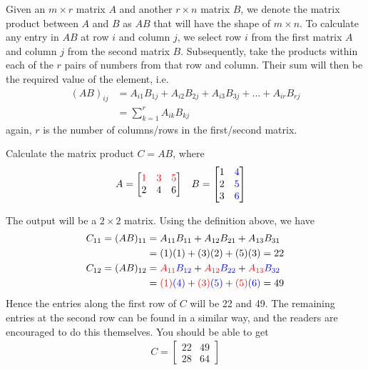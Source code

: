 \begin{defn}
\label{defn:matprod}
Given an $m \times r$ matrix $A$ and another $r \times n$ matrix $B$, we denote the matrix product between $A$ and $B$ as $AB$ that will have the shape of $m \times n$. To calculate any entry in $AB$ at row $i$ and column $j$, we select row $i$ from the first matrix $A$ and column $j$ from the second matrix $B$. Subsequently, take the products within each of the $r$ pairs of numbers from that row and column. Their sum will then be the required value of the element, i.e.\
\begin{align*}
(AB)_{ij} &= A_{i1}B_{1j} + A_{i2}B_{2j} + A_{i3}B_{3j} + ... + A_{ir}B_{rj} \\
&= \sum_{k=1}^{r} A_{ik}B_{kj}
\end{align*}
again, $r$ is the number of columns/rows in the first/second matrix.
\end{defn}
\begin{exmp}
Calculate the matrix product $C = AB$, where
\begin{align*}
& A = 
\begin{bmatrix}
\textcolor{red}{1} & \textcolor{red}{3} & \textcolor{red}{5} \\
2 & 4 & 6 
\end{bmatrix} &
& B = 
\begin{bmatrix}
1 & \textcolor{blue}{4} \\
2 & \textcolor{blue}{5} \\
3 & \textcolor{blue}{6}
\end{bmatrix}
\end{align*}
\end{exmp}
\begin{solution}
The output will be a $2 \times 2$ matrix. Using the definition above, we have
\begin{align*}
C_{11} = (AB)_{11} &= A_{11}B_{11} + A_{12}B_{21} + A_{13}B_{31} \\
&= (1)(1) + (3)(2) + (5)(3) = 22 \\
C_{12} = (AB)_{12} &= \textcolor{red}{A_{11}}\textcolor{blue}{B_{12}} + \textcolor{red}{A_{12}}\textcolor{blue}{B_{22}} + \textcolor{red}{A_{13}}\textcolor{blue}{B_{32}} \\
&= \textcolor{red}{(1)}\textcolor{blue}{(4)} + \textcolor{red}{(3)}\textcolor{blue}{(5)} + \textcolor{red}{(5)}\textcolor{blue}{(6)} = 49
\end{align*}
Hence the entries along the first row of $C$ will be 22 and 49. The remaining entries at the second row can be found in a similar way, and the readers are encouraged to do this themselves. You should be able to get
\begin{align*}
C = 
\begin{bmatrix}
22 & 49 \\
28 & 64
\end{bmatrix}   
\end{align*}
\end{solution}

